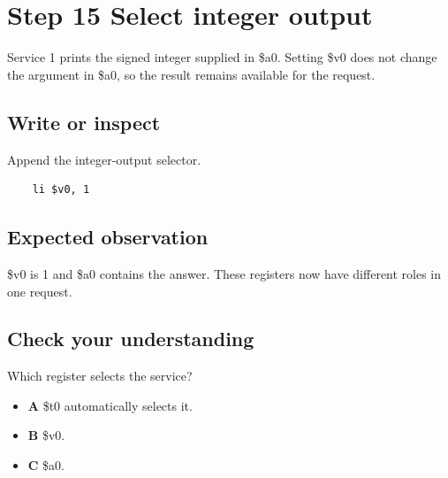 \section{Step 15 Select integer
  output}\label{001-console-calculation-s15-step-15-select-integer-output}

Service 1 prints the signed integer supplied in \$a0. Setting \$v0 does
not change the argument in \$a0, so the result remains available for the
request.

\subsection{Write or
  inspect}\label{001-console-calculation-s15-write-or-inspect}

Append the integer-output selector.

\begin{verbatim}
    li $v0, 1
\end{verbatim}

\subsection{Expected
  observation}\label{001-console-calculation-s15-expected-observation}

\$v0 is 1 and \$a0 contains the answer. These registers now have
different roles in one request.

\subsection{Check your
  understanding}\label{001-console-calculation-s15-check-your-understanding}

Which register selects the service?

\begin{itemize}
  \tightlist
  \item
        \textbf{A} \$t0 automatically selects it.
  \item
        \textbf{B} \$v0.
  \item
        \textbf{C} \$a0.
\end{itemize}

